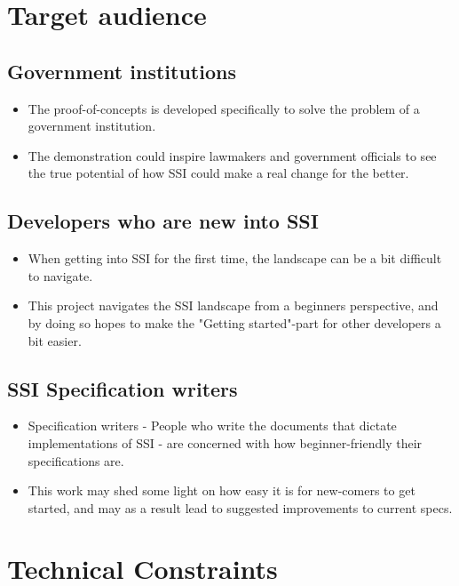 \section{Target audience}

\subsection{Government institutions}

\begin{itemize}
\item The proof-of-concepts is developed specifically to solve the problem of a government institution.
\item The demonstration could inspire lawmakers and government officials to see the true potential of how SSI could make a real change for the better.
\end{itemize}

\subsection{Developers who are new into SSI}
\begin{itemize}
\item When getting into SSI for the first time, the landscape can be a bit difficult to navigate.
\item This project navigates the SSI landscape from a beginners perspective, and by doing so hopes to make the "Getting started"-part for other developers a bit easier.
\end{itemize}

\subsection{SSI Specification writers}
\begin{itemize}
\item Specification writers - People who write the documents that dictate implementations of SSI - are concerned with how beginner-friendly their specifications are.
\item This work may shed some light on how easy it is for new-comers to get started, and may as a result lead to suggested improvements to current specs.
\end{itemize}



\section{Technical Constraints}

